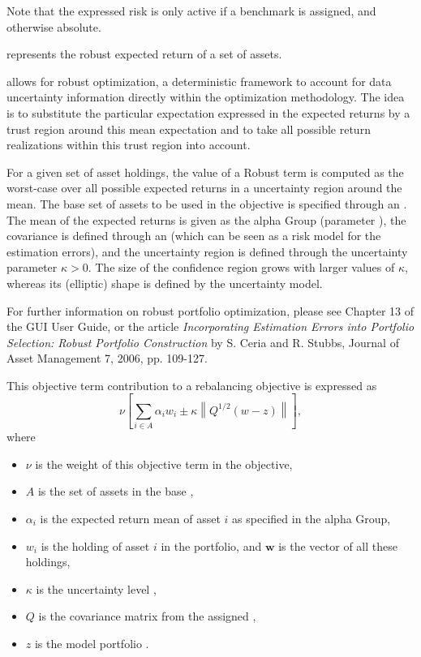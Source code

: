   Note that the expressed risk is only active if a benchmark is assigned, and otherwise absolute. 

     represents the robust expected return of a set of assets. 

     \axioma{} allows for robust optimization, a deterministic framework to account for data uncertainty information 
     directly within the optimization methodology. 
     The idea is to substitute the particular expectation expressed in the expected returns 
     by a trust region around this mean expectation and to take all possible return realizations 
     within this trust region into account. 

     For a given set of asset holdings, the value of a Robust term is computed as
     the worst-case over all possible expected returns in a uncertainty region around the mean. 
     The base set of assets to be used in the objective is specified through an . 
     The mean of the expected returns is given as the alpha Group (parameter ), 
     the covariance is defined through an  
     (which can be seen as a risk model for the estimation errors), 
     and the uncertainty region is defined through the uncertainty parameter $\kappa > 0$. 
     The size of the confidence region grows with larger values of $\kappa$, 
     whereas its (elliptic) shape is defined by the uncertainty model. 

     For further information on robust portfolio optimization, 
     please see Chapter 13 of the \axioma{} GUI User Guide, 
     or the article \emph{Incorporating Estimation Errors into Portfolio Selection: Robust Portfolio Construction}
     by S. Ceria and R. Stubbs, Journal of Asset Management 7, 2006, pp. 109-127. 

     This objective term contribution to a rebalancing objective is expressed as 
     \[
        \nu\left[\sum_{i\in A} \alpha_i w_i \pm \kappa\left\|Q^{1/2}(w-z)\right\|\right],
     \]
     where
     \begin{itemize}
			\item $\nu$ is the weight of this objective term in the objective, 
			\item $A$ is the set of assets in the base , 
			\item $\alpha_i$ is the expected return mean of asset $i$ as specified in the alpha Group, 
			\item $w_i$ is the holding of asset $i$ in the portfolio, and $\mathbf{w}$ is the vector of all these holdings, 
			\item $\kappa$ is the uncertainty level ,
			\item $Q$ is the covariance matrix from the assigned , 
			\item $z$ is the model portfolio . 
     \end{itemize}

